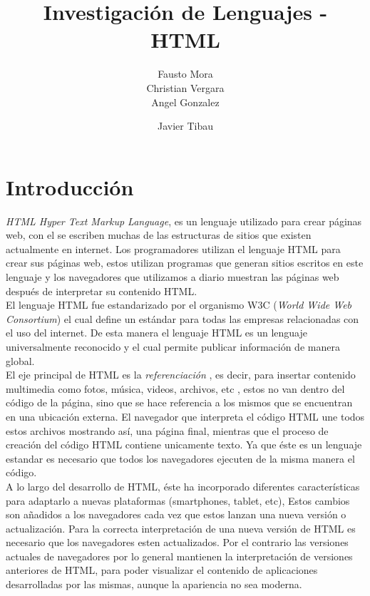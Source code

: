 \documentclass[11pt]{article} %
\title{Investigación de Lenguajes - HTML}
\author{Fausto Mora\\ Christian Vergara \\ Angel Gonzalez}
\begin{document}
\author{Javier Tibau}


\maketitle

\section{Introducción}
\newcommand{\oops}[1]{\textit{#1}}

\noindent \emph{HTML \oops{{\color{black}Hyper Text Markup Language}}}, es un lenguaje utilizado para crear páginas web, con el se escriben muchas de las estructuras de sitios que existen actualmente en internet.
Los programadores utilizan el lenguaje HTML para crear sus páginas web, estos utilizan programas que generan sitios escritos en este lenguaje y los navegadores que utilizamos a diario muestran las páginas web después de interpretar su contenido HTML.\\

\noindent El lenguaje HTML fue estandarizado por el organismo W3C (\oops{World Wide Web Consortium}) el cual define un estándar para todas las empresas relacionadas con el uso del internet. De esta manera el lenguaje HTML es un lenguaje universalmente reconocido y el cual permite publicar información de manera global.\\

\noindent El eje principal de HTML es la \oops{referenciación} , es decir, para insertar contenido multimedia como fotos, música, videos, archivos, etc , estos no van dentro del código de la página, sino que se hace referencia a los mismos que se encuentran en una ubicación externa. El navegador que interpreta el código HTML une todos estos archivos mostrando así, una página final, mientras que el proceso de creación del código HTML contiene unicamente texto. Ya que éste es un lenguaje estandar es necesario que todos los navegadores ejecuten de la misma manera el código.\\

\noindent A lo largo del desarrollo de HTML, éste ha incorporado diferentes características para adaptarlo a nuevas plataformas (smartphones, tablet, etc), Estos cambios son añadidos a los navegadores cada vez que estos lanzan una nueva versión o actualización. Para la correcta interpretación de una nueva versión de HTML es necesario que los navegadores esten actualizados. Por el contrario las versiones actuales de navegadores por lo general mantienen la interpretación de versiones anteriores de HTML, para poder visualizar el contenido de aplicaciones desarrolladas por las mismas, aunque la apariencia no sea moderna.\\
\end{document}
